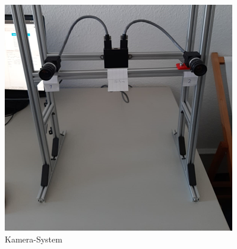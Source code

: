 \begin{figure}[H]
	\includegraphics[scale=0.3]{bilder/camerasystem}
	\caption[Kamera-System]{Kamera-System}
\end{figure}
